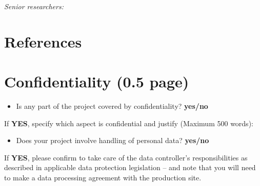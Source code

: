 \documentclass[a4paper,12pt]{article}
\newif\ifshowinstructions
\newcommand{\instructions}[1]{\ifshowinstructions {\fontsize{10}{11}\selectfont #1} \fi}
\begin{document}
{\it Senior researchers:} 

\section{References \instructions{(Maximum 30)}}

\begingroup
\small
\printbibliography[heading=none]
\endgroup

\section{Confidentiality (0.5 page)}
\begin{itemize}
\item Is any part of the project covered by confidentiality? \textbf{yes/no}
\end{itemize}
If \textbf{YES}, specify which aspect is confidential and justify (Maximum 500 words):

\begin{itemize}
\item Does your project involve handling of personal data? \textbf{yes/no}
\end{itemize}
If \textbf{YES}, please confirm to take care of the data controller’s responsibilities as described in applicable data protection legislation – and note that you will need to make a data processing agreement with the production site.
\end{document}
